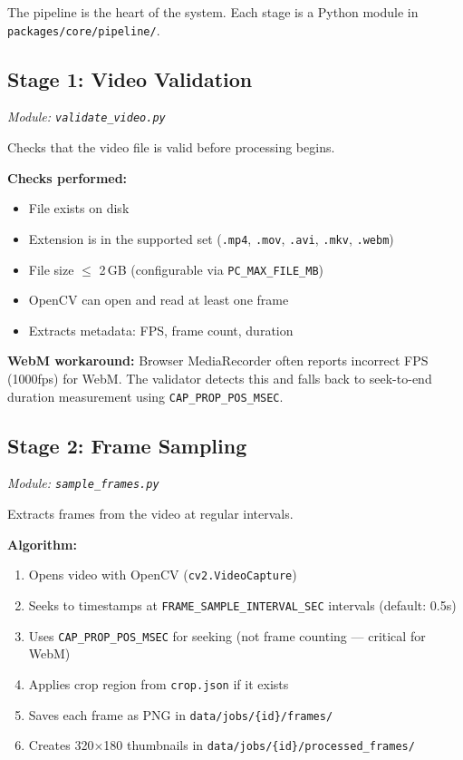 \documentclass[12pt, a4paper]{article}
\newcommand{\codeinline}[1]{\texttt{\small\colorbox{codebg}{#1}}}
\newcommand{\filepath}[1]{\texttt{\small #1}}
\begin{document}
The pipeline is the heart of the system. Each stage is a Python module in \filepath{packages/core/pipeline/}.

\subsection{Stage 1: Video Validation}
\textit{Module: \filepath{validate\_video.py}}

Checks that the video file is valid before processing begins.

\textbf{Checks performed:}
\begin{itemize}
    \item File exists on disk
    \item Extension is in the supported set (\codeinline{.mp4}, \codeinline{.mov}, \codeinline{.avi}, \codeinline{.mkv}, \codeinline{.webm})
    \item File size $\leq$ 2\,GB (configurable via \codeinline{PC\_MAX\_FILE\_MB})
    \item OpenCV can open and read at least one frame
    \item Extracts metadata: FPS, frame count, duration
\end{itemize}

\textbf{WebM workaround:} Browser MediaRecorder often reports incorrect FPS (1000fps) for WebM. The validator detects this and falls back to seek-to-end duration measurement using \codeinline{CAP\_PROP\_POS\_MSEC}.

\subsection{Stage 2: Frame Sampling}
\textit{Module: \filepath{sample\_frames.py}}

Extracts frames from the video at regular intervals.

\textbf{Algorithm:}
\begin{enumerate}
    \item Opens video with OpenCV (\codeinline{cv2.VideoCapture})
    \item Seeks to timestamps at \codeinline{FRAME\_SAMPLE\_INTERVAL\_SEC} intervals (default: 0.5s)
    \item Uses \codeinline{CAP\_PROP\_POS\_MSEC} for seeking (not frame counting --- critical for WebM)
    \item Applies crop region from \codeinline{crop.json} if it exists
    \item Saves each frame as PNG in \codeinline{data/jobs/\{id\}/frames/}
    \item Creates 320$\times$180 thumbnails in \codeinline{data/jobs/\{id\}/processed\_frames/}
\end{enumerate}
\end{document}
